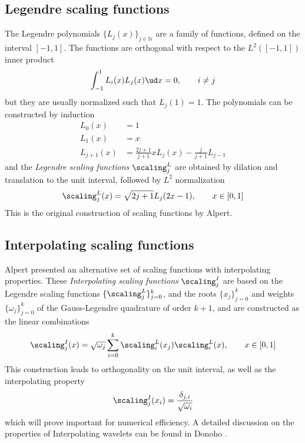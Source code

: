 \subsection{Legendre scaling functions}
The Legendre polynomials $\lbrace L_j(x)\rbrace_{j\in \mathbb{N}}$ are a family of 
functions, defined on the interval $[-1,1]$. The functions are orthogonal with 
respect to the $L^2([-1,1])$ inner product
\begin{equation}
    \int_{-1}^{1} L_i(x)L_j(x) \ud x = 0, \qquad i \neq j
\end{equation}
but they are usually normalized such that $L_j(1) = 1$. The polynomials can be 
constructed by induction
\begin{align}
    L_0(x) &= 1\\
    L_1(x) &= x\\
    L_{j+1}(x) &= \frac{2j+1}{j+1}xL_j(x) - \frac{j}{j+1}L_{j-1}
\end{align}
and the \emph{Legendre scaling functions} $\scaling_j^L$ are obtained by dilation 
and translation to the unit interval, followed by $L^2$ normalization
\begin{equation}
    \scaling_j^L(x) = \sqrt{2j+1}L_j(2x-1),\qquad x \in [0,1]
\end{equation}
This is the original construction of scaling functions by Alpert\cite{Alpert}.

\subsection{Interpolating scaling functions}
Alpert \etal\cite{Alpert} presented an alternative set of scaling functions 
with interpolating properties. These \emph{Interpolating scaling functions} 
$\scaling_j^I$ are based on the Legendre scaling functions $\lbrace \scaling_j^L
\rbrace_{j=0}^k$, and the roots $\lbrace x_j\rbrace_{j=0}^k$ and weights
$\lbrace \omega_j \rbrace_{j=0}^k$ of the Gauss-Legendre quadrature of order 
$k+1$, and are constructed as the linear combinations
\begin{equation}
    \label{eq:interpolating}
    \scaling_j^I(x) = \sqrt{\omega_j}\sum_{i=0}^{k} 
	\scaling_i^L(x_j)\scaling_i^L(x),\qquad x \in [0,1]
\end{equation}
This construction leads to orthogonality on the unit interval, as well as the 
interpolating property
\begin{equation}
    \label{eq:interprop}
    \scaling_j^I(x_i) = \frac{\delta_{j,i}}{\sqrt{\omega_i}}
\end{equation}
which will prove important for numerical efficiency. A detailed discussion on 
the properties of Interpolating wavelets can be found in Donoho \cite{Donoho}.

